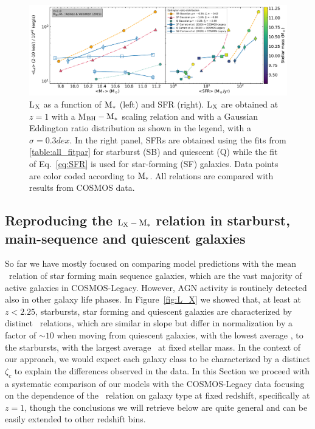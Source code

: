 \begin{figure}
\begin{center}
\includegraphics[width=\textwidth]{Figs/Chapter3/fig4_1.0_active.pdf} 
  \caption{L$_{\rm X}$ as a function of ${\rm M}_*$ (left) and SFR (right). L$_{\rm X}$ are obtained at $z=1$ with a \citet{2015ApJ...813...82R} M$_{\rm BH}-{\rm M}_*$ scaling relation and with a Gaussian Eddington ratio distribution as shown in the legend, with a $\sigma=0.3 dex$. In the right panel, SFRs are obtained using the fits from \ref{table:all_fitpar} for starburst (SB) and quiescent (Q) while the fit of Eq.~\ref{eq:SFR} is used for star-forming (SF) galaxies. Data points are color coded according to ${\rm M}_*$. All relations are compared with results from COSMOS data.}
    \label{fig:SFQSB}
\end{center}
\end{figure}

\subsection{Reproducing the ${\rm L}_{\rm X}-{\rm M}_*$ relation in starburst, main-sequence and quiescent galaxies} \label{subsec:SFQSB}

So far we have mostly focused on comparing model predictions with the mean \LXMS\ relation of star forming main sequence galaxies, which are the vast majority of active galaxies in COSMOS-Legacy. However, AGN activity is routinely detected also in other galaxy life phases. In Figure~\ref{fig:L_X} we showed that, at least at $z<2.25$, starbursts, star forming and quiescent galaxies are characterized by distinct \LXMS\ relations, which are similar in slope but differ in normalization by a factor of $\sim 10$ when moving from quiescent galaxies, with the lowest average \LX, to the starbursts, with the largest average \LX\ at fixed stellar mass. In the context of our approach, we would expect each galaxy class to be characterized by a distinct $\zeta_c$ to explain the differences observed in the data. In this Section we proceed with a systematic comparison of our models with the COSMOS-Legacy data focusing on the dependence of the \LXMS\ relation on galaxy type at fixed redshift, specifically at $z=1$, though the conclusions we will retrieve below are quite general and can be easily extended to other redshift bins.
 
